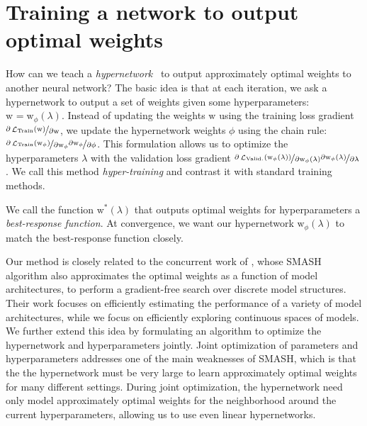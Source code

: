 \documentclass{article} %
\newcommand{\param}{\mathrm{w}} %
\newcommand{\hyper}{\lambda} %
\newcommand{\hyperFixed}{\hyper} %
\newcommand{\innerOptParam}[1]{\param^{*} \! \left( #1 \right)} %
\newcommand{\lossSymbol}{\mathop{\mathcal{L}}} %
\newcommand{\lossSymbolInner}{\lossSymbol_{\mathrm{Train}}} %
\newcommand{\lossSymbolOuter}{\lossSymbol_{\mathrm{Valid.}}} %
\newcommand{\responseParam}{\phi} %
\newcommand{\responseParamFixed}{\responseParam} %
\newcommand{\approxResponseSymbol}[1]{\param_{#1}} %
\newcommand{\approxResponse}[2]{\approxResponseSymbol{#2} ( #1 )} %
\begin{document}
\section{Training a network to output optimal weights}
\label{sec.new_formulation}
How can we teach a \emph{hypernetwork}~\citep{ha2016hypernetworks} to output approximately optimal weights to another neural network?
The basic idea is that at each iteration, we ask a hypernetwork to output a set of weights given some hyperparameters:
$\approxResponseSymbol{} = \approxResponse{\hyperFixed}{\responseParamFixed}$.
Instead of updating the weights $\param$ using the training loss gradient $\nicefrac{\partial \lossSymbolInner (\param)}{\partial \param}$, we update the hypernetwork weights $\responseParamFixed$ using the chain rule: $\nicefrac{\partial \lossSymbolInner(\param_\responseParamFixed)}{\partial \param_\responseParamFixed} \nicefrac{\partial \param_\responseParamFixed}{\partial \responseParamFixed}$.
This formulation allows us to optimize the hyperparameters $\hyper$ with the validation loss gradient $\nicefrac{\partial \lossSymbolOuter(\param_\responseParamFixed (\hyper ))}{\partial \param_\responseParamFixed (\hyper )} \nicefrac{\partial \param_\responseParamFixed (\hyper )}{\partial \hyper}$.
We call this method \emph{hyper-training} and contrast it with standard training methods.
%

We call the function $\innerOptParam{\hyper}$ that outputs optimal weights for hyperparameters a \emph{best-response function}.
At convergence, we want our hypernetwork $\approxResponse{\hyperFixed}{\responseParamFixed}$ to match the best-response function closely.

Our method is closely related to the concurrent work of \citet{brock2017smash}, whose SMASH algorithm also approximates the optimal weights as a function of model architectures, to perform a gradient-free search over discrete model structures.
Their work focuses on efficiently estimating the performance of a variety of model architectures, while we focus on efficiently exploring continuous spaces of models.
We further extend this idea by formulating an algorithm to optimize the hypernetwork and hyperparameters jointly.
Joint optimization of parameters and hyperparameters addresses one of the main weaknesses of SMASH, which is that the the hypernetwork must be very large to learn approximately optimal weights for many different settings.
During joint optimization, the hypernetwork need only model approximately optimal weights for the neighborhood around the current hyperparameters, allowing us to use even linear hypernetworks.
\end{document}
